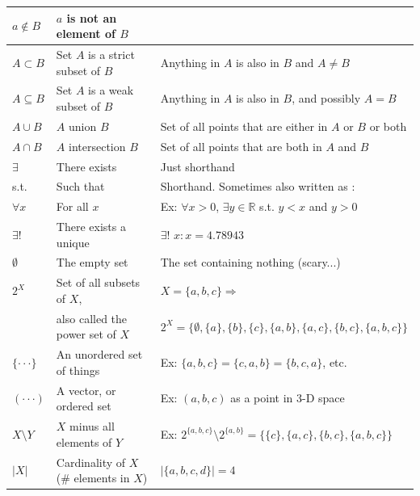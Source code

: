 \documentclass[12pt]{article}
\begin{document}
\begin{tabular}{|l|l|l|}
$a\not\in B$& $a$ is not an element of $B$ & \\ \hline

$A\subset B$&Set $A$ is a strict subset of $B$ &Anything in $A$ is also in $B$ and $A\not= B$ \\ \hline

$A\subseteq B$&Set $A$ is a weak subset of $B$ &Anything in $A$ is also in $B$, and possibly $A=B$ \\ \hline

$A \cup B$&$A$ union $B$ & Set of all points that are either in $A$ or $B$ or both \\ \hline

$A\cap B$&$A$ intersection $B$ &Set of all points that are both in $A$ and $B$ \\ \hline

$\exists$&There exists &Just shorthand \\ \hline

s.t.&Such that &Shorthand.  Sometimes also written as $:$ \\ \hline

$\forall x$& For all $x$ &Ex: $\forall x>0$, $\exists y\in \mathbb{R}$ s.t. $y<x$ and $y>0$ \\ \hline

$\exists !$&There exists a unique &$\exists !$ $x: x=4.78943$ \\ \hline

$\emptyset$&The empty set &The set containing nothing (scary...) \\ \hline

$2^X$&Set of all subsets of $X$,  &$X=\{a, b, c\}\Rightarrow$ \\ 

&also called the power set of $X$&$2^X=\{\emptyset, \{a\}, \{b\}, \{c\}, \{a,b\}, \{a, c\}, \{b, c\}, \{a, b, c\}\}$\\ \hline

$\{ \cdot \cdot \cdot \}$& An unordered set of things & Ex: $\{a, b, c\}=\{c, a, b\}=\{b, c, a\}$, etc.\\ \hline

$(\cdot \cdot \cdot)$& A vector, or ordered set &Ex: $(a, b, c)$ as a point in 3-D space \\ \hline

$X\setminus Y$&$X$ minus all elements of  $Y$  &Ex: $2^{\{a, b, c\}}\setminus 2^{\{a, b\}}= \{\{c\}, \{a, c\}, \{b, c\}, \{a, b, c\}\}$ \\ \hline

$|X|$&Cardinality of $X$ (\# elements in $X$) & $|\{a, b, c, d\}|=4$\\ \hline



\end{tabular}
\end{document}
